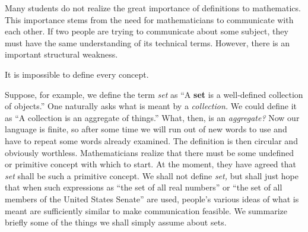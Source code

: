 \documentclass[11pt,oneside]{article}
\begin{document}
\fi
\renewcommand{\BookFooter}{Section 0 Sets and Relations}
\ifdefined\BookMaster\else\setcounter{page}{1}\fi
\BookNarrativetrue

\begin{BookBody}



\noindent Many students do not realize the great importance of definitions to mathematics. This importance stems from the need for mathematicians to communicate with each other. If two people are trying to communicate about some subject, they must have the same understanding of its technical terms. However, there is an important structural weakness.

\noindent It is impossible to define every concept.

\noindent Suppose, for example, we define the term\textit{ set} as “A\textbf{ set} is a well-defined collection of objects.” One naturally asks what is meant by a\textit{ collection.} We could define it as “A collection is an aggregate of things.” What, then, is an\textit{ aggregate?} Now our language is finite, so after some time we will run out of new words to use and have to repeat some words already examined. The definition is then circular and obviously worthless. Mathematicians realize that there must be some undefined or primitive concept with which to start. At the moment, they have agreed that\textit{ set} shall be such a primitive concept. We shall not define\textit{ set,} but shall just hope that when such expressions as “the set of all real numbers” or “the set of all members of the United States Senate” are used, people’s various ideas of what is meant are sufficiently similar to make communication feasible. We summarize briefly some of the things we shall simply assume about sets.





\end{BookBody}
\end{document}
